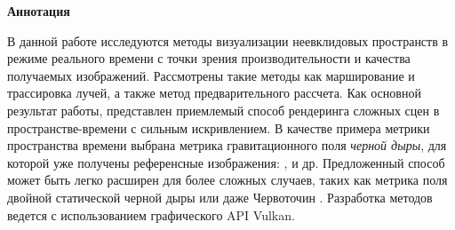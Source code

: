 \renewcommand{\abstractnamefont}{\normalfont\Large\bfseries}
\renewcommand{\abstracttextfont}{\normalfont\Huge}

\begin{center}
    \textbf{Аннотация}
\end{center}

    В данной работе исследуются методы визуализации неевклидовых пространств в режиме реального времени с точки зрения производительности и качества получаемых изображений.
	Рассмотрены такие методы как марширование и трассировка лучей, а также метод предварительного рассчета.
	Как основной результат работы, представлен приемлемый способ рендеринга сложных сцен в пространстве-времени с сильным искривлением.
	В качестве примера метрики пространства времени выбрана метрика гравитационного поля \emph{черной дыры}, для которой уже получены референсные изображения: \cite{SHolloway_2020}, \cite{yukterez} и др.
	Предложенный способ может быть легко расширен для более сложных случаев, таких как метрика поля двойной статической черной дыры \cite{Yurtsever_1995} или даже Червоточин \cite{wormhole}.
	Разработка методов ведется с использованием графического API Vulkan\cite{vulkan}.
    \vfill

    \vfill

\newpage